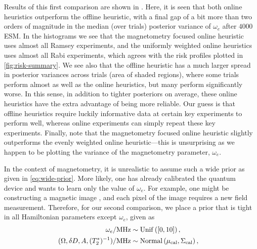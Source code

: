 \documentclass[aps,nofootinbib,twocolumn,superscriptaddress]{revtex4}
\newcommand{\calib}{{\text{cal}}}
\begin{document}
Results of this first comparison
are shown in .
Here, it is seen that both online heuristics outperform the offline heuristic, with a final
gap of a bit more than two orders of magnitude in the median (over trials)
posterior variance of $\omega_e$ after $4000$ ESM.
In the histograms we see that the magnetometry focused online heuristic
uses almost all Ramsey experiments, and the uniformly weighted online heuristics uses
almost all Rabi experiments, which agrees with the risk profiles
plotted in \autoref{fig:risk-summary}.
We see also that the offline heuristic has a much larger spread in posterior
variances across trials (area of shaded regions),
where some trials perform almost as well as the online heuristics,
but many perform significantly worse.
In this sense, in addition to tighter posteriors on average,
these online heuristics have the extra advantage of being
more reliable.
Our guess is that offline heuristics require luckily informative data at certain key
experiments to perform well, whereas online experiments can simply repeat these key
experiments.
Finally, note that the magnetometry focused
online heuristic slightly
outperforms the evenly weighted online heuristic---this
is unsurprising as we happen to be plotting the variance of the magnetometry
parameter, $\omega_e$.

In the context of magnetometry, it is unrealistic to assume such a
wide prior as given in \autoref{eq:wide-prior}.
More likely, one has already calibrated the quantum device and wants to
learn only the value of $\omega_e$.
For example, one might be constructing a magnetic image
\cite{
    maletinsky_robust_2012,
    grinolds_nanoscale_2013,
    rondin_strayfield_2013},
and each
pixel of the image requires a new field measurement.
Therefore, for our second comparison, we place a prior that is tight in all
Hamiltonian parameters except $\omega_e$, given as
\begin{subequations}
\begin{align}
    \omega_e/\si{MHz}
        &\sim \uniformdist\left( [0, 10] \right), \\
    (\Omega,\delta D,A,(T_2^*)^{-1})/\si{MHz}
        &\sim \normaldist\left(
            \mu_\calib,
            \Sigma_\calib
        \right),
\end{align}
\label{eq:calibrated-prior}%
\end{subequations}
\end{document}
